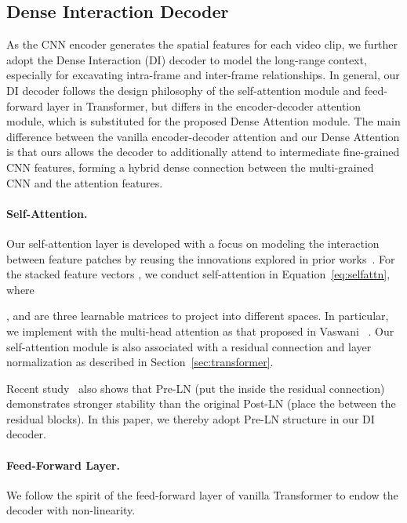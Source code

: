 \documentclass[10pt,twocolumn,letterpaper]{article}
\begin{document}
\subsection{Dense Interaction Decoder}  As the CNN encoder generates the spatial features for each video clip, we further adopt the Dense Interaction (DI) decoder to model the long-range context, especially for excavating intra-frame and inter-frame relationships. In general, our DI decoder follows the design philosophy of the self-attention module and feed-forward layer in Transformer, but differs in the encoder-decoder attention module, which is substituted for the proposed Dense Attention module. The  main difference between the vanilla encoder-decoder attention and our Dense Attention is that ours allows the decoder to additionally attend to intermediate fine-grained CNN features, forming a hybrid dense connection between the multi-grained CNN and the attention features.

\vspace{-2mm}
\paragraph{Self-Attention.}
Our self-attention layer is developed with a focus on modeling the interaction between feature patches by reusing the innovations explored in prior works~\cite{parikh2016decomposable,vaswani2017attention,lin2017structured}. For the stacked feature vectors , we conduct self-attention in Equation~\eqref{eq:selfattn}, where

, and  are three learnable matrices to project  into different spaces. In particular, we implement  with the multi-head attention as that proposed in Vaswani \etal~\cite{vaswani2017attention}. Our self-attention module is also associated with a residual connection and layer normalization  as described in Section~\ref{sec:transformer}.

Recent study~\cite{xiong2020layer} also shows that Pre-LN (put the  inside the residual connection) demonstrates stronger stability than the original Post-LN (place the  between the residual blocks). In this paper, we thereby adopt Pre-LN structure in our DI decoder.

\vspace{-2mm}
\paragraph{Feed-Forward Layer.}
We follow the spirit of the feed-forward layer  of vanilla Transformer to endow the decoder with non-linearity.
\end{document}
